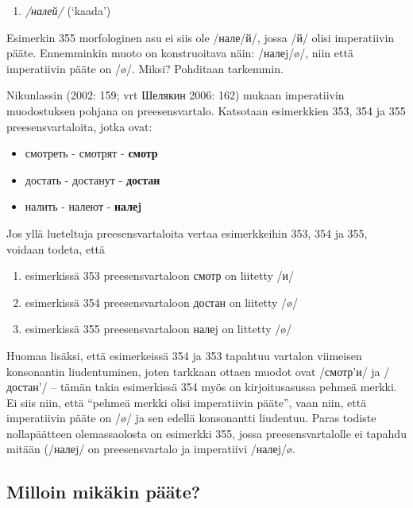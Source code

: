 \documentclass[]{scrreprt}
\providecommand{\tightlist}{%
  \setlength{\itemsep}{0pt}\setlength{\parskip}{0pt}}
\begin{document}
\begin{enumerate}
\def\labelenumi{(\arabic{enumi})}
\setcounter{enumi}{354}
\tightlist
\item
  \emph{/налей/} (`kaada')
\end{enumerate}

Esimerkin 355 morfologinen asu ei siis ole /нале/й/, jossa /й/ olisi
imperatiivin pääte. Ennemminkin muoto on konstruoitava näin: /налеj/ø/,
niin että imperatiivin pääte on /ø/. Miksi? Pohditaan tarkemmin.

Nikunlassin (2002: 159; vrt Шелякин 2006: 162) mukaan imperatiivin
muodostuksen pohjana on preesensvartalo. Katsotaan esimerkkien 353, 354
ja 355 preesensvartaloita, jotka ovat:

\begin{itemize}
\tightlist
\item
  смотреть - смотрят - \textbf{смотр}
\item
  достать - достанут - \textbf{достан}
\item
  налить - налеют - \textbf{налеj}
\end{itemize}

Jos yllä lueteltuja preesensvartaloita vertaa esimerkkeihin 353, 354 ja
355, voidaan todeta, että

\begin{enumerate}
\def\labelenumi{\arabic{enumi}.}
\tightlist
\item
  esimerkissä 353 preesensvartaloon смотр on liitetty /и/
\item
  esimerkissä 354 preesensvartaloon достан on liitetty /ø/
\item
  esimerkissä 355 preesensvartaloon налеj on littetty /ø/
\end{enumerate}

Huomaa lisäksi, että esimerkeissä 354 ja 353 tapahtuu vartalon viimeisen
konsonantin liudentuminen, joten tarkkaan ottaen muodot ovat /смотр'и/
ja /достан'/ -- tämän takia esimerkissä 354 myös on kirjoitusasussa
pehmeä merkki. Ei siis niin, että ``pehmeä merkki olisi imperatiivin
pääte'', vaan niin, että imperatiivin pääte on /ø/ ja sen edellä
konsonantti liudentuu. Paras todiste nollapäätteen olemassaolosta on
esimerkki 355, jossa preesensvartalolle ei tapahdu mitään (/налеj/ on
preesensvartalo ja imperatiivi /налеj/ø.

\subsection{Milloin mikäkin
pääte?}\label{milloin-mikuxe4kin-puxe4uxe4te}
\end{document}
